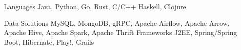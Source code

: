 


\begin{cvskills}


  \cvskill
  {Languages} %
  {Java, Python, Go, Rust, C/C++ Haskell, Clojure} %

  \cvskill
  {Data Solutions}
  {MySQL, MongoDB, gRPC, Apache Airflow, Apache Arrow, Apache Hive, Apache Spark, Apache Thrift} %
  \cvskill
  {Frameworks} %
  {J2EE, Spring/Spring Boot, Hibernate, Play!, Grails}

\end{cvskills}
